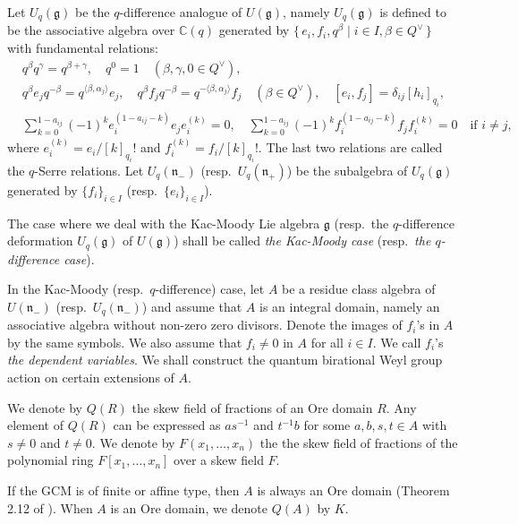 \documentclass[12pt,twoside]{article}
\newcommand\bra{\langle}
\newcommand\ket{\rangle}
\newcommand\Qv{Q^\vee}
\newcommand\g{{\mathfrak g}}
\newcommand\n{{\mathfrak n}}
\newcommand\C{{\mathbb C}} %
\theoremstyle{plain} %
\theoremstyle{definition} %
\theoremstyle{definition} %
\numberwithin{theorem}{section}
\numberwithin{equation}{section}
\numberwithin{figure}{section}
\numberwithin{table}{section}
\begin{document}
Let $U_q(\g)$ be the $q$-difference analogue of $U(\g)$, 
namely $U_q(\g)$ is defined to be the associative algebra over $\C(q)$ 
generated by $\{\,e_i,f_i,q^\beta\mid i\in I, \beta\in\Qv \,\}$ 
with fundamental relations:
\begin{align*}
 &
 q^\beta q^\gamma = q^{\beta+\gamma}, \quad q^0=1
 \quad (\beta,\gamma,0\in\Qv),
 \\ &
 q^\beta e_j q^{-\beta} = q^{ \bra\beta,\alpha_j\ket} e_j, \quad
 q^\beta f_j q^{-\beta} = q^{-\bra\beta,\alpha_j\ket} f_j
 \quad (\beta\in\Qv), \quad
 [e_i,f_j] = \delta_{ij}[h_i]_{q_i},
 \\ &
 \sum_{k=0}^{1-a_{ij}} 
 (-1)^k e_i^{(1-a_{ij}-k)}e_je_i^{(k)} = 0,
 \quad
 \sum_{k=0}^{1-a_{ij}} 
 (-1)^k f_i^{(1-a_{ij}-k)}f_jf_i^{(k)} = 0
 \quad\text{if $i\ne j$},
\end{align*}
where $e_i^{(k)}=e_i/[k]_{q_i}!$ and $f_i^{(k)}=f_i/[k]_{q_i}!$.
The last two relations are called the $q$-Serre relations.
Let $U_q(\n_-)$ (resp.\ $U_q(\n_+)$) be 
the subalgebra of $U_q(\g)$ generated by $\{f_i\}_{i\in I}$
(resp.\ $\{e_i\}_{i\in I}$).

The case where we deal with the Kac-Moody Lie algebra $\g$
(resp.\ the $q$-difference deformation $U_q(\g)$ of $U(\g)$)
shall be called {\em the Kac-Moody case} 
(resp.\ {\em the $q$-difference case}).

In the Kac-Moody (resp.\ $q$-difference) case, 
let $A$ be a residue class algebra of $U(\n_-)$ (resp.\ $U_q(\n_-)$)
and assume that $A$ is an integral domain, namely
an associative algebra without non-zero zero divisors.
Denote the images of $f_i$'s in $A$ by the same symbols.
We also assume that $f_i\ne 0$ in $A$ for all $i\in I$.
We call $f_i$'s {\em the dependent variables}.
We shall construct the quantum birational Weyl group action on 
certain extensions of $A$.

We denote by $Q(R)$ the skew field of fractions of an Ore domain $R$.
Any element of $Q(R)$ can be expressed as $as^{-1}$ and $t^{-1}b$
for some $a,b,s,t\in A$ with $s\ne 0$ and $t\ne 0$.
We denote by $F(x_1,\ldots,x_n)$ the the skew field of fractions 
of the polynomial ring $F[x_1,\ldots,x_n]$ over a skew field $F$.

If the GCM is of finite or affine type, 
then $A$ is always an Ore domain (Theorem 2.12 of \cite{Kuroki2008}).
When $A$ is an Ore domain, we denote $Q(A)$ by $K$.
\end{document}
